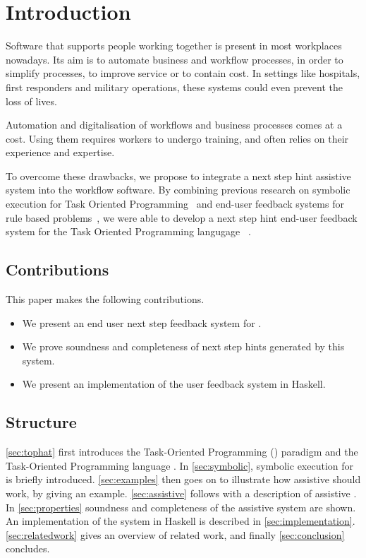 
\section{Introduction}
\label{sec:intro}

Software that supports people working together is present in most workplaces nowadays.
Its aim is to automate business and workflow processes, in order to simplify processes, to improve service or to contain cost.
In settings like hospitals, first responders and military operations, these systems could even prevent the loss of lives.


Automation and digitalisation of workflows and business processes comes at a cost.
Using them requires workers to undergo training, and often relies on their experience and expertise.

To overcome these drawbacks, we propose to integrate a next step hint assistive system into the workflow software.
By combining previous research on symbolic execution for Task Oriented Programming~\cite{Naus2019} and end-user feedback systems for rule based problems~\cite{DBLP:conf/sfp/NausJ16},
we were able to develop a next step hint end-user feedback system for the Task Oriented Programming langugage \TOPHAT~\cite{Steenvoorden2019}.




\subsection{Contributions}

This paper makes the following contributions.

\begin{itemize}
  \item We present an end user next step feedback system for \TOPHAT.
  \item We prove soundness and completeness of next step hints generated by this system.
  \item We present an implementation of the user feedback system in Haskell.
\end{itemize}


\subsection{Structure}

\cref{sec:tophat} first introduces the Task-Oriented Programming (\TOP) paradigm and the Task-Oriented Programming language \TOPHAT.
In \cref{sec:symbolic}, symbolic execution for \TOPHAT is briefly introduced.
\cref{sec:examples} then goes on to illustrate how assistive \TOPHAT should work, by giving an example.
\cref{sec:assistive} follows with a description of assistive \TOPHAT.
In \cref{sec:properties} soundness and completeness of the assistive system are shown.
An implementation of the system in Haskell is described in \cref{sec:implementation}.
\cref{sec:relatedwork} gives an overview of related work, and finally \cref{sec:conclusion} concludes.
